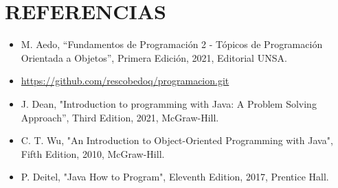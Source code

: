 \documentclass{article}
\begin{document}
	
	\section{REFERENCIAS}
	\begin{itemize}
		\item M. Aedo, “Fundamentos de Programación 2 - Tópicos de Programación Orientada a Objetos”, Primera Edición, 2021, Editorial UNSA.
		\item \url{https://github.com/rescobedoq/programacion.git}
		\item J. Dean, "Introduction to programming with Java: A Problem Solving Approach”, Third Edition, 2021, McGraw-Hill.
        \item C. T. Wu, "An Introduction to Object-Oriented Programming with Java", Fifth Edition, 2010, McGraw-Hill.
        \item P. Deitel, "Java How to Program", Eleventh Edition, 2017, Prentice Hall.
	\end{itemize}
	
%
%
%
			
\end{document}
